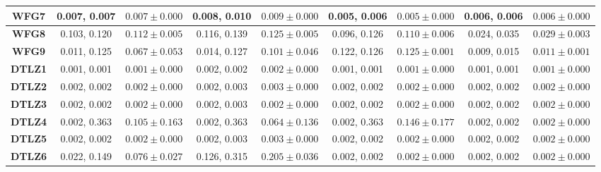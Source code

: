 \begin{table*}[t]
{\begin{tabular}{c|c|c|c|c|c|c|c|c|}
\multicolumn{1}{|c|}{\textbf{WFG7}}  & 0.007, 0.007            & $0.007 \pm 0.000$       & 0.008, 0.010            & $0.009 \pm 0.000$       & 0.005, 0.006            & $0.005 \pm 0.000$       & 0.006, 0.006            & $0.006 \pm 0.000$       \\ \hline
\multicolumn{1}{|c|}{\textbf{WFG8}}  & 0.103, 0.120            & $0.112 \pm 0.005$       & 0.116, 0.139            & $0.125 \pm 0.005$       & 0.096, 0.126            & $0.110 \pm 0.006$       & 0.024, 0.035            & $0.029 \pm 0.003$       \\ \hline
\multicolumn{1}{|c|}{\textbf{WFG9}}  & 0.011, 0.125            & $0.067 \pm 0.053$       & 0.014, 0.127            & $0.101 \pm 0.046$       & 0.122, 0.126            & $0.125 \pm 0.001$       & 0.009, 0.015            & $0.011 \pm 0.001$       \\ \hline
\multicolumn{1}{|c|}{\textbf{DTLZ1}} & 0.001, 0.001            & $0.001 \pm 0.000$       & 0.002, 0.002            & $0.002 \pm 0.000$       & 0.001, 0.001            & $0.001 \pm 0.000$       & 0.001, 0.001            & $0.001 \pm 0.000$       \\ \hline
\multicolumn{1}{|c|}{\textbf{DTLZ2}} & 0.002, 0.002            & $0.002 \pm 0.000$       & 0.002, 0.003            & $0.003 \pm 0.000$       & 0.002, 0.002            & $0.002 \pm 0.000$       & 0.002, 0.002            & $0.002 \pm 0.000$       \\ \hline
\multicolumn{1}{|c|}{\textbf{DTLZ3}} & 0.002, 0.002            & $0.002 \pm 0.000$       & 0.002, 0.003            & $0.002 \pm 0.000$       & 0.002, 0.002            & $0.002 \pm 0.000$       & 0.002, 0.002            & $0.002 \pm 0.000$       \\ \hline
\multicolumn{1}{|c|}{\textbf{DTLZ4}} & 0.002, 0.363            & $0.105 \pm 0.163$       & 0.002, 0.363            & $0.064 \pm 0.136$       & 0.002, 0.363            & $0.146 \pm 0.177$       & 0.002, 0.002            & $0.002 \pm 0.000$       \\ \hline
\multicolumn{1}{|c|}{\textbf{DTLZ5}} & 0.002, 0.002            & $0.002 \pm 0.000$       & 0.002, 0.003            & $0.003 \pm 0.000$       & 0.002, 0.002            & $0.002 \pm 0.000$       & 0.002, 0.002            & $0.002 \pm 0.000$       \\ \hline
\multicolumn{1}{|c|}{\textbf{DTLZ6}} & 0.022, 0.149            & $0.076 \pm 0.027$       & 0.126, 0.315            & $0.205 \pm 0.036$       & 0.002, 0.002            & $0.002 \pm 0.000$       & 0.002, 0.002            & $0.002 \pm 0.000$       \\ \hline

\end{tabular}}
\end{table*}
